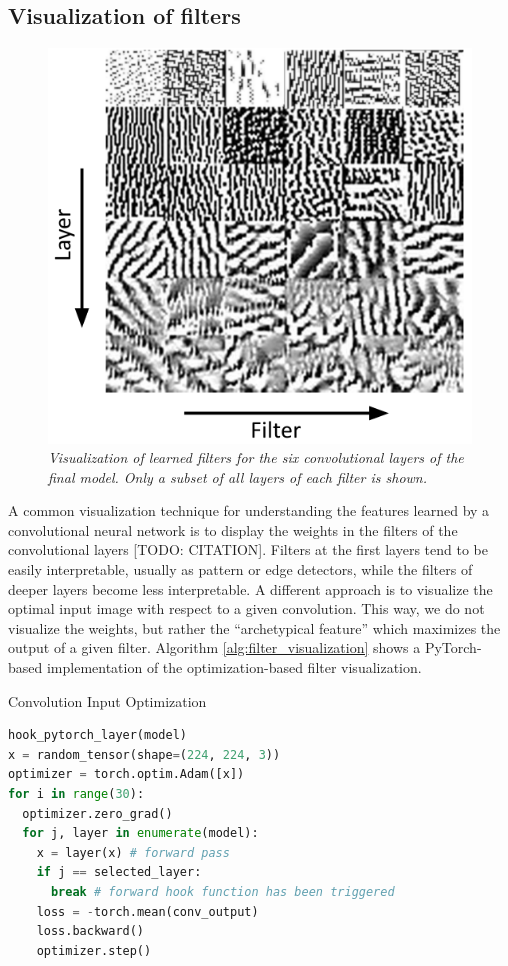 \documentclass[a4paper]{article}
\begin{document}
\subsection{Visualization of filters}
\label{sec:filter_visualization}
\begin{figure}[t]
     \centering
     \includegraphics[width=.9\linewidth]{graphics/filters}
     \caption{\textit{Visualization of learned filters for the six convolutional layers of the final model. Only a subset of all layers of each filter is shown.}}
     \label{fig:filters}
\end{figure}
A common visualization technique for understanding the features learned by a convolutional neural network is to display the weights in the filters of the convolutional layers [TODO: CITATION]. Filters at the first layers tend to be easily interpretable, usually as pattern or edge detectors, while the filters of deeper layers become less interpretable. A different approach is to visualize the optimal input image with respect to a given convolution. This way, we do not visualize the weights, but rather the \enquote{archetypical feature} which maximizes the output of a given filter. Algorithm \ref{alg:filter_visualization} shows a PyTorch-based implementation of the optimization-based filter visualization.

\begin{algorithm}
     \caption{Convolution Input Optimization}\label{alg:filter_visualization}
     \begin{lstlisting}[language=Python]
hook_pytorch_layer(model)
x = random_tensor(shape=(224, 224, 3))
optimizer = torch.optim.Adam([x])
for i in range(30):
  optimizer.zero_grad()
  for j, layer in enumerate(model):
    x = layer(x) # forward pass
    if j == selected_layer:
      break # forward hook function has been triggered
    loss = -torch.mean(conv_output)
    loss.backward()
    optimizer.step()
     \end{lstlisting}
\end{algorithm}
\end{document}
